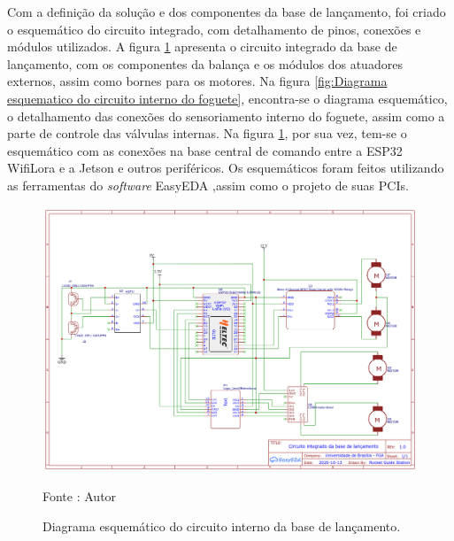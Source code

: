 Com a definição da solução e dos componentes da base de lançamento, foi criado o esquemático do circuito integrado, com detalhamento de pinos, conexões e módulos utilizados. A figura \ref{fig:Diagrama esquematico do circuito interno da base de lancamento} apresenta o circuito integrado da base de lançamento, com os componentes da balança e os módulos dos atuadores externos, assim como bornes para os motores. Na figura \ref{fig:Diagrama esquematico do circuito interno do foguete}, encontra-se o diagrama esquemático, o detalhamento das conexões do sensoriamento interno do foguete, assim como a parte de controle das válvulas internas. Na figura \ref{fig:Diagrama esquematico do circuito interno da base de lancamento}, por sua vez, tem-se o esquemático com as conexões na base central de comando entre a ESP32 WifiLora e a Jetson e outros periféricos. Os esquemáticos foram feitos utilizando as ferramentas do \textit{software} EasyEDA ,assim como o projeto de suas PCIs.

\begin{figure}[H]
  \centering
  \includegraphics[scale=0.4]{figuras/Schematic_Base_Lancamento.png}
  \caption{Diagrama esquemático do circuito interno da base de lançamento.} 
  {\footnotesize Fonte : Autor } 
  \label{fig:Diagrama esquematico do circuito interno da base de lancamento}
\end{figure}

